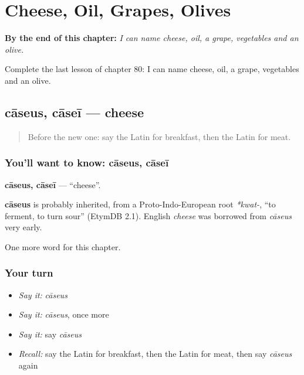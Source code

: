
\chapter{Cheese, Oil, Grapes, Olives}
\label{ch:la-cheese-oil-grapes-olives}

\begin{chapteropening}
\textbf{By the end of this chapter:} \emph{I can name cheese, oil, a grape, vegetables and an olive.}

Complete the last lesson of chapter 80: I can name cheese, oil, a grape, vegetables and an olive.
\end{chapteropening}

\section[cāseus, cāseī]{cāseus, cāseī — cheese}

\label{lesson:LA-C80-caseus}



\begin{quote}
Before the new one: say the Latin for breakfast, then the Latin for meat.
\end{quote}

\subsection*{You'll want to know: cāseus, cāseī}
\textbf{cāseus, cāseī} — \textquotedblleft{}cheese\textquotedblright{}.

\begin{cousinweb}
\textbf{cāseus} is probably inherited, from a Proto-Indo-European root \emph{*kwat-}, \textquotedblleft{}to ferment, to turn sour\textquotedblright{} (EtymDB 2.1). English \emph{cheese} was borrowed from \emph{cāseus} very early.
\end{cousinweb}

\begin{grammarlens}[title={What you've built}]
One more word for this chapter.
\end{grammarlens}

\subsection*{Your turn}
\begin{itemize}
\raggedright
  \item \emph{Say it:} \emph{cāseus}
  \item \emph{Say it:} \emph{cāseus}, once more
  \item \emph{Say it:} say \emph{cāseus}
  \item \emph{Recall:} say the Latin for breakfast, then the Latin for meat, then say \emph{cāseus} again
\end{itemize}

